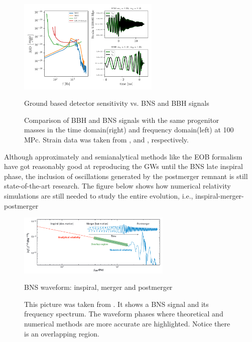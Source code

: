 \begin{figure}[hbt!]
\begin{center}
\includegraphics[width=0.6\textwidth, angle=0]{images/Data_analysis/sig_proc/BNS-BBH.pdf}
\captionsetup{width=0.8\textwidth}
\caption{Ground based detector sensitivity vs. BNS and BBH signals}
\caption*{Comparison of BBH and BNS signals with the same progenitor masses in the time domain(right) and frequency domain(left) at 100 MPc. Strain data was taken from \cite{Estelles:2020osj}, and \cite{Dietrich:2018phi}, respectively.}
\label{BBH and BNS}
\end{center}
\end{figure}

\FloatBarrier



Although approximately and semianalytical methods like the EOB formalism \cite{Damour:2012yf,PhysRevD.96.121501,Dietrich:2018uni} have got reasonably good at reproducing the GWs until the BNS late inspiral phase, the inclusion of oscillations generated by the postmerger remnant is still state-of-the-art research. The figure below shows how numerical relativity simulations are still needed to study the entire evolution, i.e., inspiral-merger-postmerger



\begin{figure}[hbt!]
\begin{center}

\includegraphics[width=0.65\textwidth, angle=0]{images/postmerger.png}
\captionsetup{width=0.8\textwidth}
\caption{BNS waveform: inspiral, merger and postmerger}
\caption*{This picture was taken from \cite{Radice_2020}. It shows a BNS signal and its frequency spectrum. The waveform phases where theoretical and numerical methods are more accurate are highlighted. Notice there is an overlapping region.}
\label{BBH and BNS2}
\end{center}
\end{figure}

